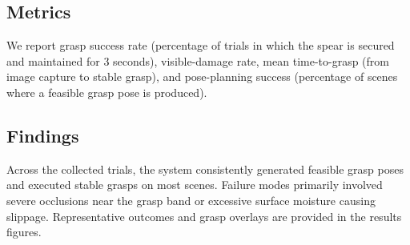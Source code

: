 \subsection*{Metrics}
We report grasp success rate (percentage of trials in which the spear is secured and maintained for 3 seconds), visible-damage rate, 
mean time-to-grasp (from image capture to stable grasp), and pose-planning success (percentage of scenes where a feasible grasp pose 
is produced).

\subsection*{Findings}
Across the collected trials, the system consistently generated feasible grasp poses and executed stable grasps on most scenes. 
Failure modes primarily involved severe occlusions near the grasp band or excessive surface moisture causing slippage. Representative 
outcomes and grasp overlays are provided in the results figures.

